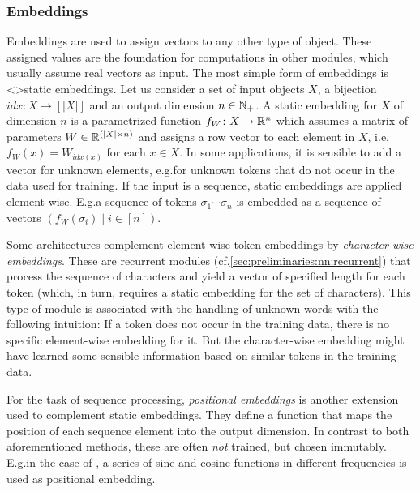 \documentclass[../document.tex]{subfiles}
\begin{document}
    \subsubsection{Embeddings}
    Embeddings are used to assign vectors to any other type of object.
    These assigned values are the foundation for computations in other modules, which usually assume real vectors as input.
    The most simple form of embeddings is <>{static embeddings}.
    Let us consider a set of input objects \(X\), a bijection \(\mathit{idx}\colon X \to [|X|]\) and an output dimension \(n \in \mathbb{N}_+\).
    A static embedding for \(X\) of dimension \(n\) is a parametrized function \(f_W\colon X \to \mathbb{R}^n\) which assumes a matrix of parameters \(W \in \mathbb{R}^{(|X| \times n)}\) and assigns a row vector to each element in \(X\), i.e.\@ \(f_W(x) = W_{\mathit{idx}(x)}\) for each \(x \in X\).
    In some applications, it is sensible to add a vector for unknown elements, e.g.\@ for unknown tokens that do not occur in the data used for training.
    If the input is a sequence, static embeddings are applied element-wise.
    E.g.\@ a sequence of tokens \(\sigma_1 \cdots \sigma_n\) is embedded as a sequence of vectors \((f_W(\sigma_i) \mid i \in [n])\).

    Some architectures complement element-wise token embeddings by \emph{character-wise embeddings}. \citep{}
    These are recurrent modules (cf.\@ \cref{sec:preliminaries:nn:recurrent}) that process the sequence of characters and yield a vector of specified length for each token (which, in turn, requires a static embedding for the set of characters).
    This type of module is associated with the handling of unknown words with the following intuition:
        If a token does not occur in the training data, there is no specific element-wise embedding for it.
        But the character-wise embedding might have learned some sensible information based on similar tokens in the training data.

    For the task of sequence processing, \emph{positional embeddings} is another extension used to complement static embeddings.
    They define a function that maps the position of each sequence element into the output dimension.
    In contrast to both aforementioned methods, these are often \emph{not} trained, but chosen immutably.
    E.g.\@ in the case of , a series of sine and cosine functions in different frequencies is used as positional embedding.

\end{document}

